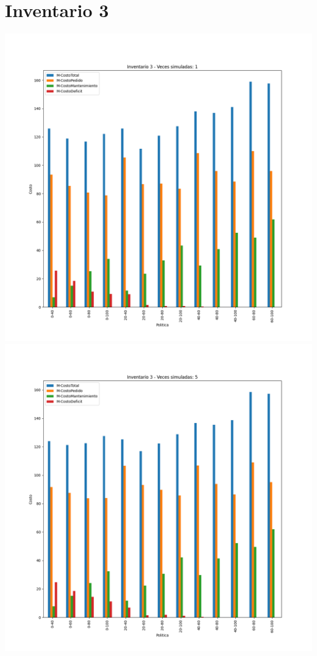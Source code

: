 \documentclass[11pt,a4paper]{report}
\begin{document}
\section{Inventario 3}
\begin{center}
	\includegraphics[width=0.4\textheight]{img/Cap-2/inventario-3/inventario3-1veces.png}
	\includegraphics[width=0.4\textheight]{img/Cap-2/inventario-3/inventario3-5veces.png}

\end{center}
\end{document}
